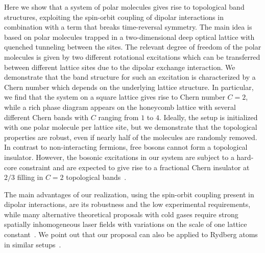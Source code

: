 
Here we show that a system of polar molecules gives rise to topological band structures, exploiting the spin-orbit coupling of dipolar interactions in combination with a term that breaks time-reversal symmetry.
The main idea is based on polar molecules trapped in a two-dimensional deep optical lattice with quenched tunneling between the sites.
The relevant degree of freedom of the polar molecules is given by two different rotational excitations which can be transferred between different lattice sites due to the dipolar exchange interaction.
We demonstrate that the band structure for such an excitation is characterized by a Chern number which depends on the underlying lattice structure.
In particular, we find that the system on a square lattice gives rise to Chern number $C=2$, while a rich phase diagram appears on the honeycomb lattice with several different Chern bands with $C$ ranging from $1$ to $4$.
Ideally, the setup is initialized with one polar molecule per lattice site, but we demonstrate that the topological properties are robust, even if nearly half of the molecules are randomly removed.
In contrast to non-interacting fermions, free bosons cannot form a topological insulator. However,
the bosonic excitations in our system are subject to a hard-core constraint and are expected to give rise to a fractional Chern insulator at $2/3$ filling in $C=2$ topological bands~\cite{Moller2009,Wang2012a,Sterdyniak2015}.

The main advantages of our realization, using the spin-orbit coupling present in dipolar interactions, are its robustness and the low experimental requirements, while many alternative theoretical proposals with cold gases require strong spatially inhomogeneous laser fields with variations on the scale of one lattice constant~\cite{Liu2010,Stanescu2010,Goldman2013,Li2008,Yao2012,Yao2013,Goldman2013,Jaksch2003}.
We point out that our proposal can also be applied to Rydberg atoms in similar setups~\cite{Barredo2014,Piotrowicz2013,Nogrette2014}.


